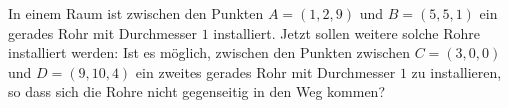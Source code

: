 In einem Raum ist zwischen den Punkten $A=(1,2,9)$ und $B=(5,5,1)$
ein gerades Rohr mit Durchmesser $1$ installiert.
Jetzt sollen weitere solche Rohre installiert werden:
Ist es möglich, zwischen den Punkten zwischen $C=(3,0,0)$ und $D=(9,10,4)$
ein zweites gerades Rohr mit Durchmesser $1$ zu installieren, so dass sich
die Rohre nicht gegenseitig in den Weg kommen?



